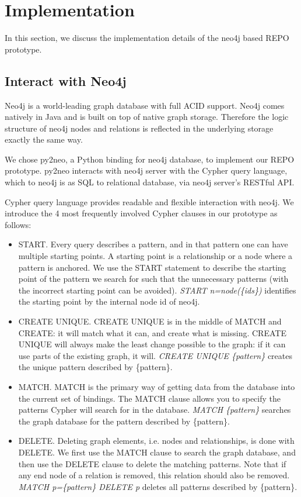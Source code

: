 \section{Implementation}

In this section, we discuss the implementation details of the neo4j based REPO prototype.

\subsection{Interact with Neo4j}

Neo4j is a world-leading graph database with full ACID support. Neo4j comes natively in Java and is built on top of native graph storage. Therefore the logic structure of neo4j nodes and relations is reflected in the underlying storage exactly the same way.

We chose py2neo, a Python binding for neo4j database, to implement our REPO prototype. py2neo interacts with neo4j server with the Cypher query language, which to neo4j is as SQL to relational database, via neo4j server's RESTful API.

Cypher query language provides readable and flexible interaction with neo4j. We introduce the 4 most frequently involved Cypher clauses in our prototype as follows:
\begin{itemize}
    \item START. Every query describes a pattern, and in that pattern one can have multiple starting points. A starting point is a relationship or a node where a pattern is anchored. We use the START statement to describe the starting point of the pattern we search for such that the unnecessary patterns (with the incorrect starting point can be avoided). \emph{START n=node(\{ids\})} identifies the starting point by the internal node id of neo4j.
    \item CREATE UNIQUE. CREATE UNIQUE is in the middle of MATCH and CREATE: it will match what it can, and create what is missing. CREATE UNIQUE will always make the least change possible to the graph: if it can use parts of the existing graph, it will. \emph{CREATE UNIQUE \{pattern\}} creates the unique pattern described by \{pattern\}.
    \item MATCH. MATCH is the primary way of getting data from the database into the current set of bindings. The MATCH clause allows you to specify the patterns Cypher will search for in the database. \emph{MATCH \{pattern\}} searches the graph database for the pattern described by \{pattern\}.
    \item DELETE. Deleting graph elements, i.e. nodes and relationships, is done with DELETE. We first use the MATCH clause to search the graph database, and then use the DELETE clause to delete the matching patterns. Note that if any end node of a relation is removed, this relation should also be removed. \emph{MATCH p=\{pattern\} DELETE p} deletes all patterns described by \{pattern\}.
\end{itemize}

